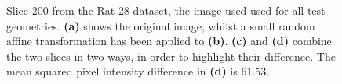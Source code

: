 \begin{figure}[htbp]
    \caption{Slice 200 from the Rat 28 dataset, the image used used for all test geometries. \textbf{(a)} shows the original image, whilst a small random affine transformation has been applied to \textbf{(b)}. \textbf{(c)} and \textbf{(d)} combine the two slices in two ways, in order to highlight their difference. The mean squared pixel intensity difference in \textbf{(d)} is 61.53.}
    \label{fig:original_displacement}
  \end{figure}
  
  \begin{figure}[htbp]
    \centering
     \quad

\end{figure}

